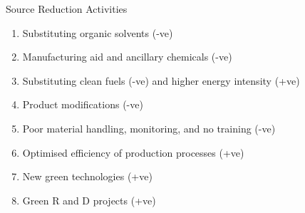 \documentclass[aspectratio = 169]{beamer}
\begin{document}
    \begin{frame}{Source Reduction Activities}
        \begin{enumerate}
            \item Substituting organic solvents (-ve)
            \item Manufacturing aid and ancillary chemicals (-ve)
            \item Substituting clean fuels (-ve) and higher energy intensity (+ve)
            \item Product modifications (-ve)
            \item Poor material handling, monitoring, and no training (-ve)
            \item Optimised efficiency of production processes (+ve)
            \item New green technologies (+ve)
            \item Green R and D projects (+ve)
        \end{enumerate}
        \hypertarget{Mechanism Source Reduction}{}
        \hyperlink{tab:mechanism-source-reduction}{}
        \hypertarget{Mechanism Material Products}{}
        \hyperlink{tab:mechanism-material-products-submod}{}
        \hypertarget{Mechanism Process}{}
        \hyperlink{tab:mechanism-process}{}
        \hypertarget{Mechanism Inventory Operations}{}
        \hyperlink{tab:mechanism-inventory-operations}{}
    \end{frame}
\end{document}
